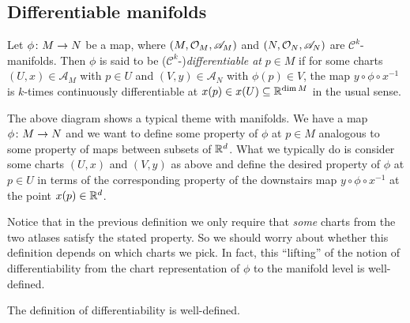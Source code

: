 \subsection{Differentiable manifolds}
\bd
Let $\phi\colon M\to N$ be a map, where $(M,\mathcal{O}_M,\mathscr{A}_M)$ and $(N,\mathcal{O}_N,\mathscr{A}_N)$ are $\mathcal{C}^k$-manifolds. Then $\phi$ is said to be ($\mathcal{C}^k$-)\emph{differentiable at} $p\in M$ if for some charts $(U,x)\in\mathscr{A}_M$ with $p\in U$ and $(V,y)\in\mathscr{A}_N$ with $\phi(p)\in V$, the map $y\circ\phi\circ x^{-1}$ is $k$-times continuously differentiable at $x(p)\in x(U)\subseteq\mathbb{R}^{\dim M}$ in the usual sense.
\bse
{}
\ese
\ed
The above diagram shows a typical theme with manifolds. We have a map $\phi\colon M\to N$ and we want to define some property of $\phi$ at $p\in M$ analogous to some property of maps between subsets of $\mathbb{R}^d$. What we typically do is consider some charts $(U,x)$ and $(V,y)$ as above and define the desired property of $\phi$ at $p\in U$ in terms of the corresponding property of the downstairs map $y\circ\phi\circ x^{-1}$ at the point $x(p)\in\mathbb{R}^d$.

Notice that in the previous definition we only require that \emph{some} charts from the two atlases satisfy the stated property. So we should worry about whether this definition depends on which charts we pick. In fact, this ``lifting'' of the notion of differentiability from the chart representation of $\phi$ to the manifold level is well-defined.

\bp
The definition of differentiability is well-defined.
\ep

